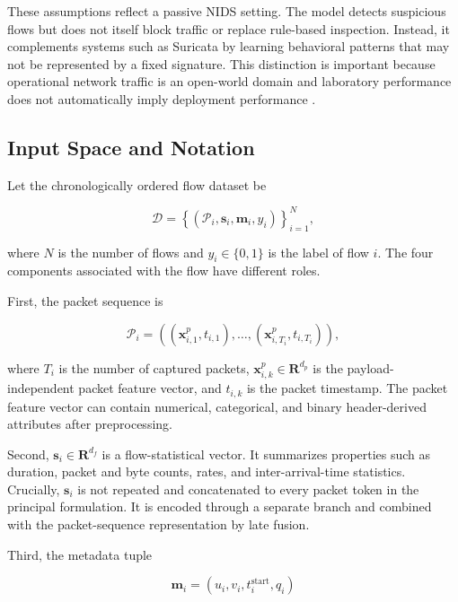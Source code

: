 These assumptions reflect a passive NIDS setting. The model detects suspicious
flows but does not itself block traffic or replace rule-based inspection.
Instead, it complements systems such as Suricata by learning behavioral
patterns that may not be represented by a fixed signature. This distinction is
important because operational network traffic is an open-world domain and
laboratory performance does not automatically imply deployment performance
\cite{SommerPaxson2010}.

\subsection{Input Space and Notation}
\label{subsec:pf_notation}

Let the chronologically ordered flow dataset be

\begin{equation}
\mathcal{D}
=
\left\{
\left(\mathcal{P}_i,\mathbf{s}_i,\mathbf{m}_i,y_i\right)
\right\}_{i=1}^{N},
\label{eq:dataset_definition}
\end{equation}

where $N$ is the number of flows and $y_i\in\{0,1\}$ is the label of flow
$i$. The four components associated with the flow have different roles.

First, the packet sequence is

\begin{equation}
\mathcal{P}_i
=
\left(
(\mathbf{x}_{i,1}^{p},t_{i,1}),
\ldots,
(\mathbf{x}_{i,T_i}^{p},t_{i,T_i})
\right),
\label{eq:packet_sequence}
\end{equation}

where $T_i$ is the number of captured packets, $\mathbf{x}_{i,k}^{p}\in
\mathbf{R}^{d_p}$ is the payload-independent packet feature vector, and
$t_{i,k}$ is the packet timestamp. The packet feature vector can contain
numerical, categorical, and binary header-derived attributes after
preprocessing.

Second, $\mathbf{s}_i\in\mathbf{R}^{d_f}$ is a flow-statistical vector. It
summarizes properties such as duration, packet and byte counts, rates, and
inter-arrival-time statistics. Crucially, $\mathbf{s}_i$ is not repeated and
concatenated to every packet token in the principal formulation. It is encoded
through a separate branch and combined with the packet-sequence representation
by late fusion.

Third, the metadata tuple

\begin{equation}
\mathbf{m}_i=(u_i,v_i,t_i^{\mathrm{start}},q_i)
\label{eq:flow_metadata}
\end{equation}

